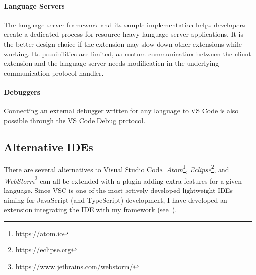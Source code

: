 \paragraph{Language Servers} The language server framework and its sample implementation helps developers create a dedicated process for resource-heavy language server applications. It is the better design choice if the extension may slow down other extensions while working. Its possibilities are limited, as custom communication between the client extension and the language server needs modification in the underlying communication protocol handler.

\paragraph{Debuggers} Connecting an external debugger written for any language to VS Code is also possible through the VS Code Debug protocol.

\subsection{Alternative IDEs}
There are several alternatives to Visual Studio Code. \emph{Atom}\footnote{\small\url{https://atom.io}}, \emph{Eclipse}\footnote{\small\url{https://eclipse.org}}, and \emph{WebStorm}\footnote{\small\url{https://www.jetbrains.com/webstorm/}} can all be extended with a plugin adding extra features for a given language. Since VSC is one of the most actively developed lightweight IDEs aiming for JavaScript (and TypeScript) development, I have developed an extension integrating the IDE with my framework (see~).
